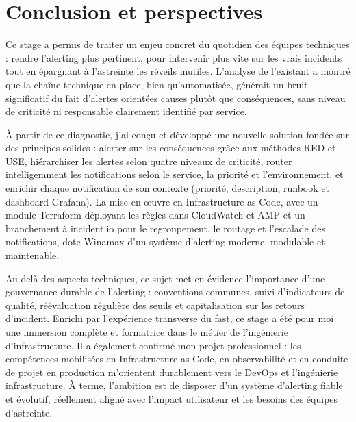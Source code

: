\chapter*{Conclusion et perspectives}

Ce stage a permis de traiter un enjeu concret du quotidien des équipes techniques : rendre l'alerting
plus pertinent, pour intervenir plus vite sur les vrais incidents tout en épargnant à l'astreinte les
réveils inutiles. L'analyse de l'existant a montré que la chaîne technique en place, bien qu'automatisée,
générait un bruit significatif du fait d'alertes orientées causes plutôt que conséquences, sans niveau de
criticité ni responsable clairement identifié par service.

À partir de ce diagnostic, j'ai conçu et développé une nouvelle solution fondée sur des principes solides
: alerter sur les conséquences grâce aux méthodes RED et USE, hiérarchiser les alertes selon quatre
niveaux de criticité, router intelligemment les notifications selon le service, la priorité et
l'environnement, et enrichir chaque notification de son contexte (priorité, description, runbook et
dashboard Grafana). La mise en œuvre en Infrastructure as Code, avec un module Terraform déployant
les règles dans CloudWatch et AMP et un branchement à incident.io pour le regroupement, le routage et
l'escalade des notifications, dote Winamax d'un système d'alerting moderne, modulable et maintenable.

Au-delà des aspects techniques, ce sujet met en évidence l'importance d'une gouvernance durable de
l'alerting : conventions communes, suivi d'indicateurs de qualité, réévaluation régulière des seuils et
capitalisation sur les retours d'incident. Enrichi par l'expérience transverse du fast, ce stage a été pour
moi une immersion complète et formatrice dans le métier de l'ingénierie d'infrastructure. Il a
également confirmé mon projet professionnel : les compétences mobilisées en Infrastructure as
Code, en observabilité et en conduite de projet en production m'orientent durablement vers le
DevOps et l'ingénierie infrastructure. À terme, l'ambition est de disposer d'un système d'alerting
fiable et évolutif, réellement aligné avec l'impact utilisateur et les besoins des équipes d'astreinte.
